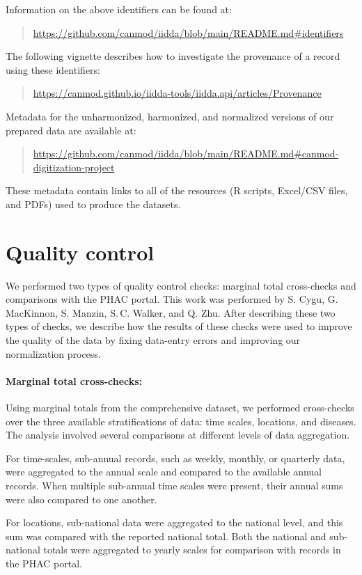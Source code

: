 \documentclass[12pt]{article}
\begin{document}
Information on the above identifiers can be found at:
\begin{quote}
  \url{https://github.com/canmod/iidda/blob/main/README.md#identifiers}
\end{quote}
The following vignette describes how to investigate the provenance of a record using these identifiers:
\begin{quote}
  \url{https://canmod.github.io/iidda-tools/iidda.api/articles/Provenance}
\end{quote}
Metadata for the unharmonized, harmonized, and normalized versions of our prepared data are available at:
\begin{quote}
\url{https://github.com/canmod/iidda/blob/main/README.md#canmod-digitization-project}
\end{quote}
These metadata contain links to all of the resources (R scripts, Excel/CSV files, and PDFs) used to produce the datasets.

\clearpage

\section{Quality control}\label{sec:appendix-quality-control}

We performed two types of quality control checks: marginal total cross-checks and comparisons with the PHAC portal. This work was performed by S. Cygu, G. MacKinnon, S. Manzin, S.\,C. Walker, and Q. Zhu. After describing these two types of checks, we describe how the results of these checks were used to improve the quality of the data by fixing data-entry errors and improving our normalization process.

\paragraph{Marginal total cross-checks:} Using marginal totals from the comprehensive dataset, we performed cross-checks over the three available stratifications of data: time scales, locations, and diseases. The analysis involved several comparisons at different levels of data aggregation.

For time-scales, sub-annual records, such as weekly, monthly, or quarterly data, were aggregated to the annual scale and compared to the available annual records. When multiple sub-annual time scales were present, their annual sums were also compared to one another.

For locations, sub-national data were aggregated to the national level, and this sum was compared with the reported national total. Both the national and sub-national totals were aggregated to yearly scales for comparison with records in the PHAC portal.
\end{document}
